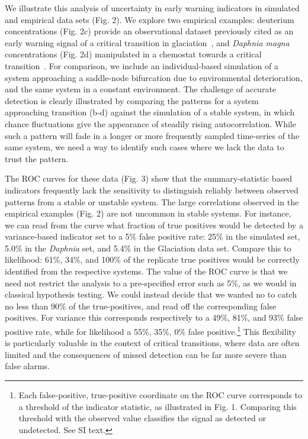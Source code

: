 \documentclass{pnastwo}
\begin{document}
\begin{article}
We illustrate this analysis of uncertainty in early warning indicators in simulated and empirical data sets (Fig. 2). 
We explore two empirical examples:
deuterium concentrations (Fig. 2c) provide an observational dataset previously cited as an early warning signal of a critical transition in glaciation~\cite{Dakos2008},
and \emph{Daphnia magna} concentrations (Fig. 2d) manipulated in a chemostat towards a critical transition~\cite{Drake2010}.  
For comparison, we include an individual-based simulation of a system approaching a saddle-node bifurcation due to environmental deterioration,
and the same system in a constant environment. 
The challenge of accurate detection is clearly illustrated by comparing the patterns for a system approaching transition (b-d) 
against the simulation of a stable system, in which chance fluctuations give the appearance of steadily rising autocorrelation. 
While such a pattern will fade in a longer or more frequently sampled time-series of the same system, 
we need a way to identify such cases where we lack the data to trust the pattern.  

The ROC curves for these data (Fig. 3) show that the summary-statistic based indicators 
frequently lack the sensitivity to distinguish reliably between observed patterns from a stable or unstable system. 
The large correlations observed in the empirical examples (Fig. 2) are not uncommon in stable systems. 
For instance, we can read from the curve what fraction of true positives would be detected by a variance-based indicator
set to a 5\% false positive rate: 25\% in the simulated set, 5.0\% in the \emph{Daphnia} set, and 5.4\% in the Glaciation data set.
Compare this to likelihood: 61\%, 34\%, and 100\% of the replicate true positives would be correctly identified from the respective systems.
The value of the ROC curve is that we need not restrict the analysis to a pre-specified error such as 5\%, as we would in classical hypothesis testing.  
We could instead decide that we wanted no to catch no less than 90\% of the true-positives, and read off the corresponding false positives.  
For variance this corresponds respectively to a 49\%, 81\%, and 93\% false positive rate, while for likelihood a 55\%, 35\%, 0\% false positive.\footnote{
Each false-positive, true-positive coordinate on the ROC curve corresponds to a threshold of the indicator statistic, as illustrated in Fig. 1.  
Comparing this threshold with the observed value classifies the signal as detected or undetected.  See SI text.}
This flexibility is particularly valuable in the context of critical transitions, 
where data are often limited and the consequences of missed detection can be far more severe than false alarms.  



\end{article}
\end{document}
